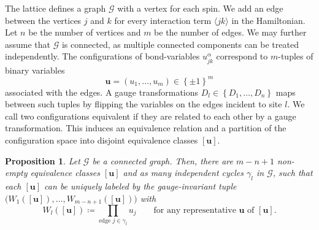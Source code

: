 \documentclass[%
fontsize=12pt, %
twoside=off %
]{scrbook}
\newtheorem{proposition}{Proposition}
\begin{document}
The lattice defines a graph $\mathcal{G}$ with a vertex for each spin. We add an edge between the vertices $j$ and $k$ for every interaction term $\langle jk\rangle$ in the Hamiltonian. Let $n$ be the number of vertices and $m$ be the number of edges. We may further assume that $\mathcal{G}$ is connected, as multiple connected components can be treated independently. The configurations of bond-variables $u_{jk}^\alpha$ correspond to $m$-tuples of binary variables 
\begin{equation}
	\bm u = \left(u_1,\dots,u_m\right)\in \left\{\pm 1\right\}^m
\end{equation}
associated with the edges. A gauge transformations $D_l\in\left\{D_1,\dots,D_n\right\}$ maps between such tuples by flipping the variables on the edges incident to site $l$. We call two configurations equivalent if they are related to each other by a gauge transformation. This induces an equivalence relation and a partition of the configuration space into disjoint equivalence classes $[\bm u]$.

\begin{proposition}
	Let $\mathcal{G}$ be a connected graph. Then, there are $m-n+1$ non-empty equivalence classes $[\bm u]$ and as many independent cycles $\gamma_l$ in $\mathcal{G}$, such that each $[\bm u]$ can be uniquely labeled by the gauge-invariant tuple $\Big(W_1([\bm u]),\dots,W_{m-n+1}([\bm u])\Big)$ with
	\begin{equation}
		W_{l}([\bm u]) \coloneq \prod_{\text{edge }j \in \gamma_l} u_j\qquad \text{for any representative $\bm u$ of $[\bm u]$}.
		\label{eq:definitionWl}
	\end{equation}
\end{proposition}
\end{document}
